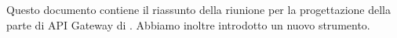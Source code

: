 Questo documento contiene il riassunto della riunione per la progettazione della parte di API Gateway di \progetto. Abbiamo inoltre introdotto un nuovo strumento.